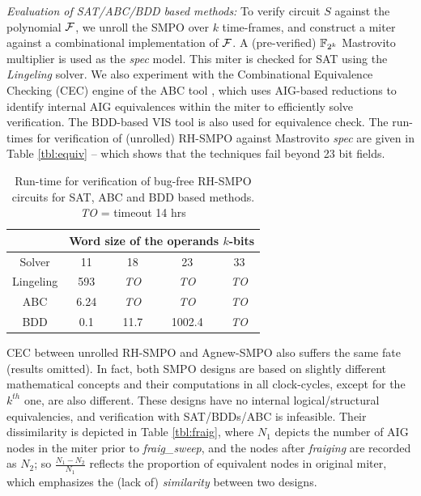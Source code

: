 {\it Evaluation of SAT/ABC/BDD based methods:} To verify circuit $S$
against the polynomial ${\mathcal{F}}$, we unroll the SMPO over $k$ time-frames,
and construct a miter against a combinational implementation of ${\mathcal{F}}$.
A (pre-verified) ${\mathbb{F}}_{2^k}$ Mastrovito multiplier \cite{mastro:1989} is
used as the {\it spec} model. This miter is checked for SAT using the
\emph{Lingeling} \cite{biere2013lingeling} solver. We also experiment
with the Combinational Equivalence Checking (CEC) engine of the ABC
tool \cite{abc}, which uses AIG-based reductions to identify internal
AIG equivalences within the miter to efficiently solve
verification. The BDD-based VIS tool \cite{brayton1996vis} is also used
for equivalence check. The run-times for verification of (unrolled)
RH-SMPO against Mastrovito {\it   spec} are given in Table
\ref{tbl:equiv} -- which shows that the techniques fail beyond 23 bit
fields.  

\vspace{-0.1in}
\begin{table}[htb]
\centering
\caption{\small Run-time for verification of bug-free RH-SMPO circuits
  for SAT, ABC and BDD based methods. \emph{TO} = timeout 14 hrs}
\label{tbl:equiv}
\begin{tabular}{|c||c|c|c|c|} 
\hline
& \multicolumn{4}{|c|}{Word size of the operands $k$-bits}  \\
\hline
Solver & 11 & 18 & 23 & 33 \\
\hline
\hline
Lingeling & 593  & \emph{TO}  & \emph{TO}  & \emph{TO}\\
\hline
\hline
ABC & 6.24 & \emph{TO} & \emph{TO} & \emph{TO}\\
\hline
\hline
BDD & 0.1 & 11.7 & 1002.4 & \emph{TO}  \\
\hline
\end{tabular}
\label{table:satbdd}  
\end{table} 

CEC between unrolled RH-SMPO and Agnew-SMPO also suffers the same fate
(results omitted). In fact, both SMPO designs are based on slightly
different mathematical concepts and their computations in all
clock-cycles, except for the $k^{th}$ one, are also different. These
designs have no internal logical/structural equivalencies, and
verification with SAT/BDDs/ABC is infeasible. Their dissimilarity is
depicted in Table \ref{tbl:fraig}, where  $N_1$ depicts the number of
AIG nodes in the miter prior to {\it fraig\_sweep}, and the nodes
after {\it fraiging} are recorded as $N_2$; so $\frac{N_1-N_2}{N_1}$
reflects the proportion of equivalent nodes in original miter, which
emphasizes the (lack of) \emph{similarity} between two designs.  

